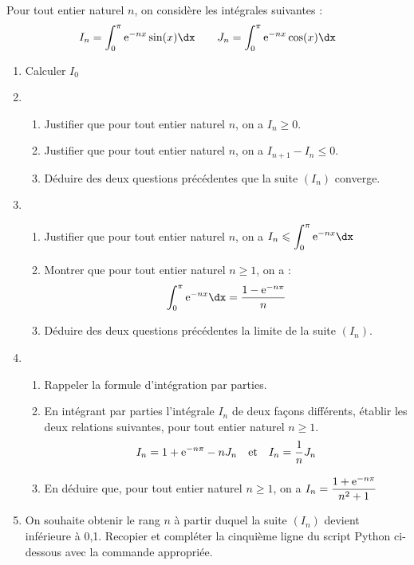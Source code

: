 \documentclass[11pt,fleqn, openany]{book} %
\begin{document}
\begin{exercise}[subtitle={(Amérique du Nord 2024)}]

Pour tout entier naturel $n$, on considère les intégrales suivantes :
\[I_n = \displaystyle\int_0^{\pi}\e^{-nx}\sin(x)\dx \qquad J_n=\displaystyle\int_0^{\pi}\e^{-nx}\cos(x)\dx\]

\begin{enumerate}
\item Calculer $I_0$
\vskip10pt
\item \begin{enumerate}
\item Justifier que pour tout entier naturel $n$, on a $I_n \geqslant 0$.
\item Justifier que pour tout entier naturel $n$, on a $I_{n+1}-I_n \leqslant 0$.
\item Déduire des deux questions précédentes que la suite $(I_n)$ converge.\end{enumerate}
\vskip10pt
\item \begin{enumerate} \item Justifier que pour tout entier naturel $n$, on a $I_n \leqslant \displaystyle\int_0^{\pi} \e^{-nx}\dx$
\item Montrer que pour tout entier naturel $n\geqslant 1$, on a :
\[\displaystyle\int_0^{\pi}\e^{-nx}\dx=\dfrac{1-\e^{-n\pi}}{n}\]
\item Déduire des deux questions précédentes la limite de la suite $(I_n)$. \end{enumerate}
\vskip10pt
\item \begin{enumerate} \item Rappeler la formule d'intégration par parties.
\item En intégrant par parties l'intégrale $I_n$ de deux façons différents, établir les deux relations suivantes, pour tout entier naturel $n\geqslant 1$.
\[I_n=1+\mathrm{e}^{-n\pi}-nJ_n \quad\text{et}\quad I_n=\dfrac{1}{n}J_n\]
\item En déduire que, pour tout entier naturel $n\geqslant 1$, on a $I_n=\dfrac{1+\mathrm{e}^{-n\pi}}{n^2+1}$\end{enumerate}
\item On souhaite obtenir le rang $n$ à partir duquel la suite $(I_n)$ devient inférieure à 0,1. Recopier et compléter la cinquième ligne du script Python ci-dessous avec la commande appropriée.

\end{enumerate}
\newpage
\end{exercise}
\end{document}
